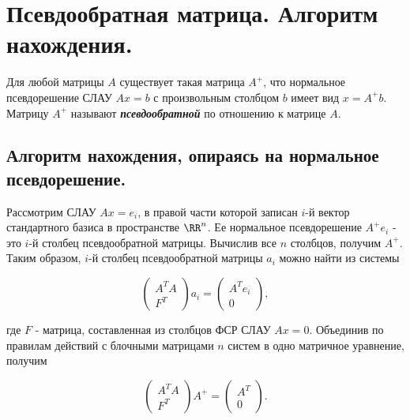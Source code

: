 \section{
    Псевдообратная матрица. Алгоритм нахождения.
}

\begin{definition}
    Для любой матрицы $A$ существует такая матрица $A^+$, что нормальное псевдорешение СЛАУ $Ax = b$ с произвольным столбцом $b$ имеет вид $x = A^+b$. Матрицу $A^+$ называют \textit{\textbf{псевдообратной}} по отношению к матрице $A$.
\end{definition}

\subsection{
    Алгоритм нахождения, опираясь на нормальное псевдорешение.
}

Рассмотрим СЛАУ $Ax = e_i$, в правой части которой записан $i$-й вектор стандартного базиса в пространстве $\RR^n$. Ее нормальное псевдорешение $A^+e_i$ - это $i$-й столбец псевдообратной матрицы. Вычислив все $n$ столбцов, получим $A^+$. Таким образом, $i$-й столбец псевдообратной матрицы $a_i$ можно найти из системы

\begin{equation*}
    \left(\begin{array}{c}
        A^TA \\
        F^T
    \end{array}\right)a_i
    =
    \left(\begin{array}{c}
        A^Te_i \\
        0
    \end{array}\right)
,\end{equation*}

где $F$ - матрица, составленная из столбцов ФСР СЛАУ $Ax = 0$. Объединив по правилам действий с блочными матрицами $n$ систем в одно матричное уравнение, получим

\begin{equation*}
    \left(\begin{array}{c}
        A^TA \\
        F^T
    \end{array}\right)A^+
    =
    \left(\begin{array}{c}
        A^T \\
        0
    \end{array}\right)
.\end{equation*}

